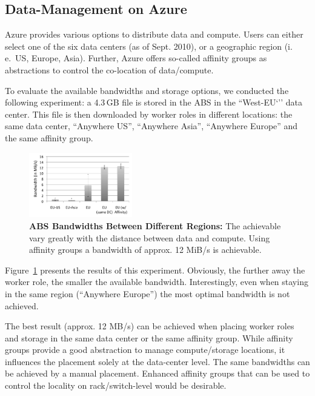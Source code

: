\documentclass[conference,final]{IEEEtran}
\newcommand{\up}{\vspace*{-1em}}
\newcommand{\jhanote}[1]{ {\textcolor{red} { ***SJ: #1 }}}
\newcommand{\jhanote}[1]{}
\begin{document}
\subsection{Data-Management on Azure}
\up Azure provides various options to distribute data and
compute. Users can either select one of the six data centers (as of
Sept. 2010), or a geographic region (i.\,e.\ US, Europe,
Asia). Further, Azure offers so-called affinity groups as abstractions
to control the co-location of data/compute.

To evaluate the available bandwidths and storage options, we conducted
the following experiment: a 4.3\,GB file is stored in the ABS in the
``West-EU`'' data center. This file is then downloaded by worker roles
in different locations: the same data center, ``Anywhere US'',
``Anywhere Asia'', ``Anywhere Europe'' and the same affinity group.

\begin{figure}[t]
  \centering
        \includegraphics[width=0.4\textwidth]{performance/azure-data-transfer.pdf}
          \caption{\textbf{ABS Bandwidths Between
            Different Regions:} The achievable vary greatly with the
          distance between data and compute. Using affinity groups a
          bandwidth of approx. 12 MiB/s is achievable.}
    \label{fig:performance_azure-data-transfer}
\end{figure}
Figure~\ref{fig:performance_azure-data-transfer} presents the results
of this experiment.  Obviously, the further away the worker role,
the smaller the available bandwidth. Interestingly, even when staying
in the same region (``Anywhere Europe'') the most optimal bandwidth is
not achieved.

The best result (approx. 12 MB/s) %
can be achieved when placing worker roles and storage in the same data
center or the same affinity group. While affinity groups provide a
good abstraction to manage compute/storage locations, it influences
the placement solely at the data-center level. The same bandwidths can
be achieved by a manual placement. Enhanced affinity groups that can
be used to control the locality on rack/switch-level would be
desirable.
\end{document}
